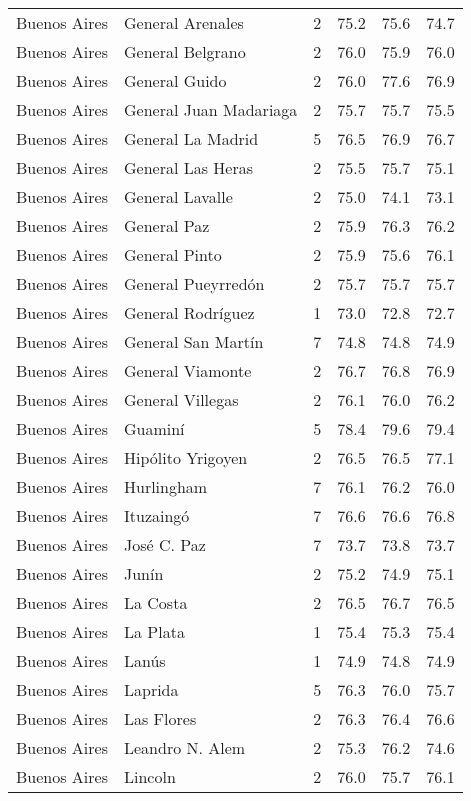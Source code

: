 \documentclass[12pt,spanish,]{article}
\begin{document}
\begin{landscape}
\begin{longtable}[t]{llrrrr}
\addlinespace
Buenos Aires & General Arenales & 2 & 75.2 & 75.6 & 74.7\\
Buenos Aires & General Belgrano & 2 & 76.0 & 75.9 & 76.0\\
Buenos Aires & General Guido & 2 & 76.0 & 77.6 & 76.9\\
Buenos Aires & General Juan Madariaga & 2 & 75.7 & 75.7 & 75.5\\
Buenos Aires & General La Madrid & 5 & 76.5 & 76.9 & 76.7\\
\addlinespace
Buenos Aires & General Las Heras & 2 & 75.5 & 75.7 & 75.1\\
Buenos Aires & General Lavalle & 2 & 75.0 & 74.1 & 73.1\\
Buenos Aires & General Paz & 2 & 75.9 & 76.3 & 76.2\\
Buenos Aires & General Pinto & 2 & 75.9 & 75.6 & 76.1\\
Buenos Aires & General Pueyrredón & 2 & 75.7 & 75.7 & 75.7\\
\addlinespace
Buenos Aires & General Rodríguez & 1 & 73.0 & 72.8 & 72.7\\
Buenos Aires & General San Martín & 7 & 74.8 & 74.8 & 74.9\\
Buenos Aires & General Viamonte & 2 & 76.7 & 76.8 & 76.9\\
Buenos Aires & General Villegas & 2 & 76.1 & 76.0 & 76.2\\
Buenos Aires & Guaminí & 5 & 78.4 & 79.6 & 79.4\\
\addlinespace
Buenos Aires & Hipólito Yrigoyen & 2 & 76.5 & 76.5 & 77.1\\
Buenos Aires & Hurlingham & 7 & 76.1 & 76.2 & 76.0\\
Buenos Aires & Ituzaingó & 7 & 76.6 & 76.6 & 76.8\\
Buenos Aires & José C. Paz & 7 & 73.7 & 73.8 & 73.7\\
Buenos Aires & Junín & 2 & 75.2 & 74.9 & 75.1\\
\addlinespace
Buenos Aires & La Costa & 2 & 76.5 & 76.7 & 76.5\\
Buenos Aires & La Plata & 1 & 75.4 & 75.3 & 75.4\\
Buenos Aires & Lanús & 1 & 74.9 & 74.8 & 74.9\\
Buenos Aires & Laprida & 5 & 76.3 & 76.0 & 75.7\\
Buenos Aires & Las Flores & 2 & 76.3 & 76.4 & 76.6\\
\addlinespace
Buenos Aires & Leandro N. Alem & 2 & 75.3 & 76.2 & 74.6\\
Buenos Aires & Lincoln & 2 & 76.0 & 75.7 & 76.1\\

\end{longtable}
\end{landscape}
\end{document}

